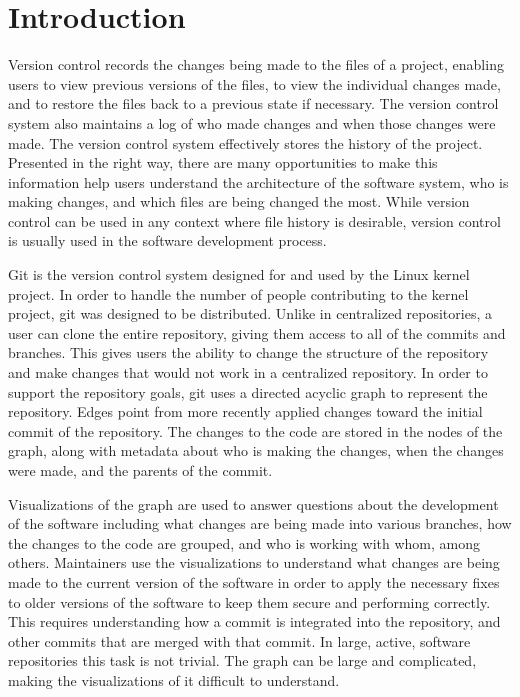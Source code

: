\chapter{Introduction}

Version control records the changes being made to the files of a
project, enabling users to view previous versions of the files, to view
the individual changes made, and to restore the files back to a previous
state if necessary. The version control system also maintains a log of
who made changes and when those changes were made. The version control
system effectively stores the history of the project. Presented in the
right way, there are many opportunities to make this information help
users understand the architecture of the software system, who is making
changes, and which files are being changed the most. While version
control can be used in any context where file history is desirable,
version control is usually used in the software development process.

Git is the version control system designed for and used by the Linux
kernel project. In order to handle the number of people contributing to
the kernel project, git was designed to be distributed. Unlike in
centralized repositories, a user can clone the entire repository, giving
them access to all of the commits and branches. This gives users the
ability to change the structure of the repository and make changes that
would not work in a centralized repository. In order to support the
repository goals, git uses a directed acyclic graph to represent the
repository. Edges point from more recently applied changes toward the
initial commit of the repository. The changes to the code are stored in
the nodes of the graph, along with metadata about who is making the
changes, when the changes were made, and the parents of the commit.

Visualizations of the graph are used to answer questions about the
development of the software including what changes are being made into
various branches, how the changes to the code are grouped, and who is
working with whom, among others. Maintainers use the visualizations to
understand what changes are being made to the current version of the
software in order to apply the necessary fixes to older versions of the
software to keep them secure and performing correctly. This requires
understanding how a commit is integrated into the repository, and other
commits that are merged with that commit. In large, active, software
repositories this task is not trivial. The graph can be large and
complicated, making the visualizations of it difficult to understand.


